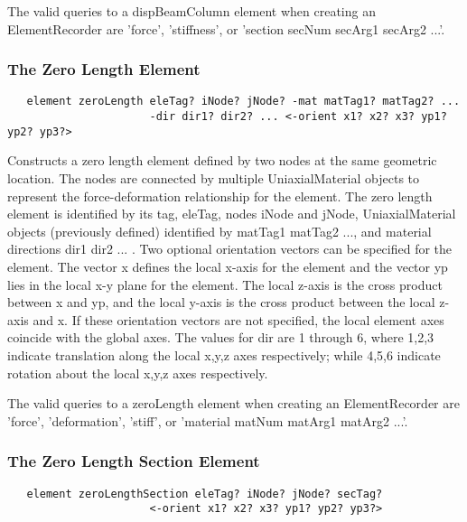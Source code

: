 \documentclass[12pt]{article}
\begin{document}
The valid queries to a dispBeamColumn element when creating an
ElementRecorder are 'force', 'stiffness', or 'section secNum secArg1 secArg2 ...'.

\subsubsection{The Zero Length Element}
{\sf\small
\begin{verbatim}
   element zeroLength eleTag? iNode? jNode? -mat matTag1? matTag2? ...
                      -dir dir1? dir2? ... <-orient x1? x2? x3? yp1? yp2? yp3?>
\end{verbatim}
}

\noindent Constructs a zero length element defined by two nodes at the
same geometric location. The nodes are connected by multiple
UniaxialMaterial objects to represent the force-deformation
relationship for the element. The zero length element is identified
by its tag, eleTag, nodes iNode and jNode, UniaxialMaterial objects
(previously defined) identified by matTag1 matTag2 ..., and material
directions dir1 dir2 ... . Two optional orientation vectors can be
specified for the element. The vector x defines the local x-axis for
the element and the vector yp lies in the local x-y plane for the
element. The local z-axis is the cross product between x and yp, and
the local y-axis is the cross product between the local z-axis and x.
If these orientation vectors are not specified, the local element axes
coincide with the global axes. The values for dir are 1 through 6,
where 1,2,3 indicate translation along the local x,y,z axes
respectively; while 4,5,6 indicate rotation about the local x,y,z axes
respectively. 

The valid queries to a zeroLength element when creating an ElementRecorder
are 'force', 'deformation', 'stiff', or 'material matNum matArg1 matArg2 ...'.

\subsubsection{The Zero Length Section Element}
{\sf\small
\begin{verbatim}
   element zeroLengthSection eleTag? iNode? jNode? secTag?
                      <-orient x1? x2? x3? yp1? yp2? yp3?>
\end{verbatim}
}
\end{document}
